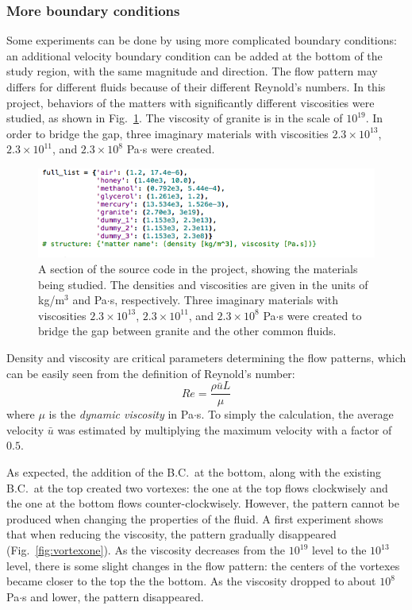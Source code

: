 \documentclass[12pt]{article}
\numberwithin{figure}{section}  %
\numberwithin{equation}{section}  %
\begin{document}
\begin{multicols}{2}
\subsubsection{More boundary conditions}

Some experiments can be done by using more complicated boundary conditions: an additional velocity boundary condition can be added at the bottom of the study region, with the same magnitude and direction. The flow pattern may differs for different fluids because of their different Reynold's numbers. In this project, behaviors of the matters with significantly different viscosities were studied, as shown in Fig.\ \ref{fig:materials}. The viscosity of granite is in the scale of $10^{19}$. In order to bridge the gap, three imaginary materials with viscosities $2.3\times10^{13}$, $2.3\times10^{11}$, and $2.3\times10^{8}$ Pa$\cdot$s were created.

\begin{figure}[!htb]
	\centering
	\includegraphics[width=0.7\linewidth]{../Python/report/ns_test/ns_test}
	\caption{A section of the source code in the project, showing the materials being studied. The densities and viscosities are given in the units of kg/m$^3$ and Pa$\cdot$s, respectively. Three imaginary materials with viscosities $2.3\times10^{13}$, $2.3\times10^{11}$, and $2.3\times10^{8}$ Pa$\cdot$s were created to bridge the gap between granite and the other common fluids.}
	\label{fig:materials}
\end{figure}

Density and viscosity are critical parameters determining the flow patterns, which can be easily seen from the definition of Reynold's number:
\begin{equation}\label{eq:reynolds}
	Re = \dfrac{\rho\bar{u}L}{\mu}
\end{equation}
where $\mu$ is the \emph{dynamic viscosity} in Pa$\cdot$s. To simply the calculation, the average velocity $\bar{u}$ was estimated by multiplying the maximum velocity with a factor of $0.5$.

As expected, the addition of the B.C.\ at the bottom, along with the existing B.C.\ at the top created two vortexes: the one at the top flows clockwisely and the one at the bottom flows counter-clockwisely. However, the pattern cannot be produced when changing the properties of the fluid. A first experiment shows that when reducing the viscosity, the pattern gradually disappeared (Fig.\ \ref{fig:vortexone}). As the viscosity decreases from the $10^{19}$ level to the $10^{13}$ level, there is some slight changes in the flow pattern: the centers of the vortexes became closer to the top the the bottom. As the viscosity dropped to about $10^8$ Pa$\cdot$s and lower, the pattern disappeared.


\end{multicols}
\end{document}
